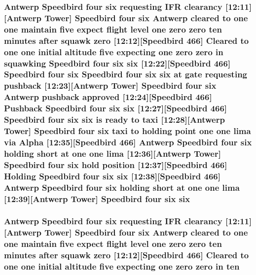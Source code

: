 \subsubsection[{\texorpdfstring{six}{six}}]{\setlength{\rightskip}{0pt plus 5cm}Antwerp Speedbird four six requesting I\+FR clearancy \mbox{[}12\+:11\mbox{]}\mbox{[}Antwerp {\bf Tower}\mbox{]} Speedbird four six Antwerp cleared to {\bf one} {\bf one} maintain five expect flight level {\bf one} {\bf zero} {\bf zero} {\bf ten} minutes after squawk {\bf zero} \mbox{[}12\+:12\mbox{]}\mbox{[}Speedbird 466\mbox{]} Cleared to {\bf one} {\bf one} initial altitude five expecting {\bf one} {\bf zero} {\bf zero} in {\bf squawking} Speedbird four six six \mbox{[}12\+:22\mbox{]}\mbox{[}Speedbird 466\mbox{]} Speedbird four six Speedbird four six six at gate requesting pushback \mbox{[}12\+:23\mbox{]}\mbox{[}Antwerp {\bf Tower}\mbox{]} Speedbird four six Antwerp pushback {\bf approved} \mbox{[}12\+:24\mbox{]}\mbox{[}Speedbird 466\mbox{]} Pushback Speedbird four six six \mbox{[}12\+:27\mbox{]}\mbox{[}Speedbird 466\mbox{]} Speedbird four six six is ready to taxi \mbox{[}12\+:28\mbox{]}\mbox{[}Antwerp {\bf Tower}\mbox{]} Speedbird four six taxi to holding point {\bf one} {\bf one} {\bf lima} via {\bf Alpha} \mbox{[}12\+:35\mbox{]}\mbox{[}Speedbird 466\mbox{]} Antwerp Speedbird four six holding short at {\bf one} {\bf one} {\bf lima} \mbox{[}12\+:36\mbox{]}\mbox{[}Antwerp {\bf Tower}\mbox{]} Speedbird four six hold {\bf position} \mbox{[}12\+:37\mbox{]}\mbox{[}Speedbird 466\mbox{]} Holding Speedbird four six six \mbox{[}12\+:38\mbox{]}\mbox{[}Speedbird 466\mbox{]} Antwerp Speedbird four six holding short at {\bf one} {\bf one} {\bf lima} \mbox{[}12\+:39\mbox{]}\mbox{[}Antwerp {\bf Tower}\mbox{]} Speedbird four six six}\hypertarget{happyDay5ExpectedATC_8txt_a57978282a95204080c8ffb626c7d0bd5}{}\label{happyDay5ExpectedATC_8txt_a57978282a95204080c8ffb626c7d0bd5}
\subsubsection[{\texorpdfstring{ten}{ten}}]{\setlength{\rightskip}{0pt plus 5cm}Antwerp Speedbird four {\bf six} requesting I\+FR clearancy \mbox{[}12\+:11\mbox{]}\mbox{[}Antwerp {\bf Tower}\mbox{]} Speedbird four {\bf six} Antwerp cleared to {\bf one} {\bf one} maintain five expect flight level {\bf one} {\bf zero} {\bf zero} ten minutes after squawk {\bf zero} \mbox{[}12\+:12\mbox{]}\mbox{[}Speedbird 466\mbox{]} Cleared to {\bf one} {\bf one} initial altitude five expecting {\bf one} {\bf zero} {\bf zero} in ten}\hypertarget{happyDay5ExpectedATC_8txt_ab9794f8235db42812d8ddd9368cb321e}{}\label{happyDay5ExpectedATC_8txt_ab9794f8235db42812d8ddd9368cb321e}
